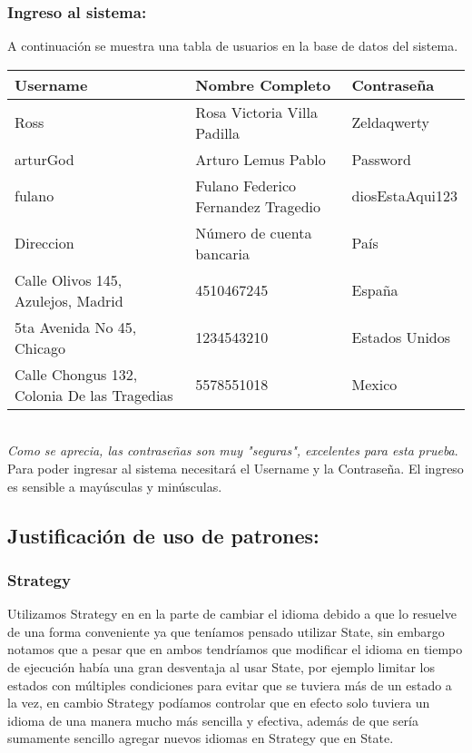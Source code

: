 \documentclass{article}
\begin{document}
\subsubsection*{Ingreso al sistema:}
A continuación se muestra una tabla de usuarios en la base de datos del sistema.
\begin{table}[h]
  \begin{tabular}{|l|l|l|}
  \hline
  \rowcolor[HTML]{C0C0C0} 
  {\color[HTML]{000000} Username}             & {\color[HTML]{000000} Nombre Completo} & {\color[HTML]{000000} Contraseña} \\ \hline
  Ross                                        & Rosa Victoria Villa Padilla            & Zeldaqwerty                       \\ \hline
  arturGod                                    & Arturo Lemus Pablo                     & Password                          \\ \hline
  fulano                                      & Fulano Federico Fernandez Tragedio     & diosEstaAqui123                   \\ \hline
  \rowcolor[HTML]{C0C0C0} 
  Direccion                                   & Número de cuenta bancaria              & País                              \\ \hline
  Calle Olivos 145, Azulejos, Madrid          & 4510467245                             & España                            \\ \hline
  5ta Avenida No 45, Chicago                  & 1234543210                             & Estados Unidos                    \\ \hline
  Calle Chongus 132, Colonia De las Tragedias & 5578551018                             & Mexico                            \\ \hline
  \end{tabular}
  \end{table}\\
  \textit{Como se aprecia, las contraseñas son muy "seguras", excelentes para esta prueba}.\\
  Para poder ingresar al sistema necesitará el Username y la Contraseña. El ingreso es sensible a mayúsculas y minúsculas.
  


\newpage
\subsection*{Justificación de uso de patrones:}
\subsubsection*{Strategy}
Utilizamos Strategy en en la parte de cambiar el idioma debido a que lo resuelve
de una forma conveniente ya que teníamos pensado utilizar State, sin embargo notamos
que a pesar que en ambos tendríamos que modificar el idioma en tiempo de ejecución
había una gran desventaja al usar State, por ejemplo limitar los estados con múltiples
condiciones para evitar que se tuviera más de un estado a la vez, en cambio Strategy
podíamos controlar que en efecto solo tuviera un idioma de una manera mucho más sencilla
y efectiva, además de que sería sumamente sencillo agregar nuevos idiomas en Strategy
que en State.
\end{document}
